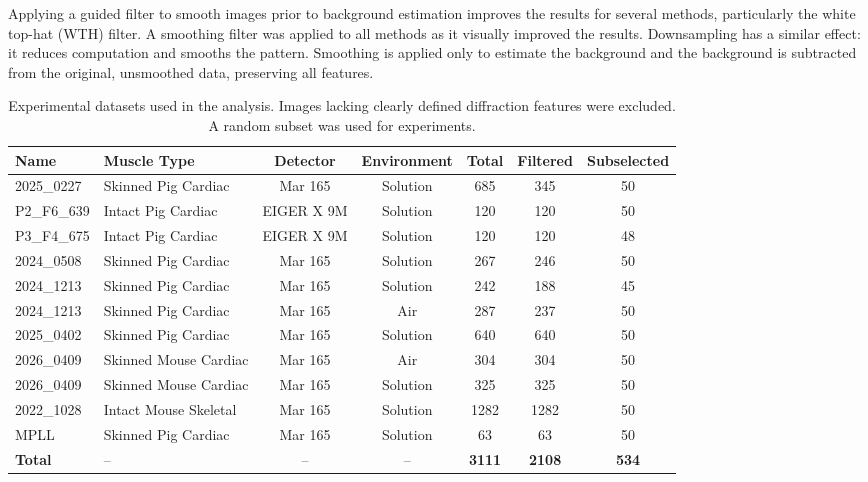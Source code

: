 \documentclass[journal,article,submit,moreauthors]{Definitions/mdpi}
\begin{document}
Applying a guided filter to smooth images prior to background estimation improves the results for several methods, particularly the white top-hat (WTH) filter. A smoothing filter was applied to all methods as it visually improved the results. Downsampling has a similar effect: it reduces computation and smooths the pattern. Smoothing is applied only to estimate the background and the background is subtracted from the original, unsmoothed data, preserving all features.

\begin{table}[h]
\caption{Experimental datasets used in the analysis. Images lacking clearly defined diffraction features were excluded. A random subset was used for experiments.}
\label{tab:datasets}
\centering
\footnotesize
\setlength{\tabcolsep}{4pt}
\renewcommand{\arraystretch}{1.0}
\begin{tabular}{@{}llccccc@{}}
\toprule
\textbf{Name} & \textbf{Muscle Type} & \textbf{Detector} & \textbf{Environment} & \textbf{Total} & \textbf{Filtered} & \textbf{Subselected} \\ \midrule
2025\_0227 & Skinned Pig Cardiac & Mar 165 & Solution & 685 & 345 & 50 \\
P2\_F6\_639 & Intact Pig Cardiac & EIGER X 9M & Solution & 120 & 120 & 50 \\
P3\_F4\_675 & Intact Pig Cardiac & EIGER X 9M & Solution & 120 & 120 & 48 \\
2024\_0508 & Skinned Pig Cardiac & Mar 165 & Solution & 267 & 246 & 50 \\
2024\_1213 & Skinned Pig Cardiac & Mar 165 & Solution & 242 & 188 & 45 \\
2024\_1213 & Skinned Pig Cardiac & Mar 165 & Air & 287 & 237 & 50 \\
2025\_0402 & Skinned Pig Cardiac & Mar 165 & Solution & 640 & 640 & 50 \\
2026\_0409 & Skinned Mouse Cardiac & Mar 165 & Air & 304 & 304 & 50 \\
2026\_0409 & Skinned Mouse Cardiac & Mar 165 & Solution & 325 & 325 & 50 \\
2022\_1028 & Intact Mouse Skeletal & Mar 165 & Solution & 1282 & 1282 & 50 \\
MPLL & Skinned Pig Cardiac & Mar 165 & Solution & 63 & 63 & 50 \\ \midrule
\textbf{Total} & -- & -- & -- & \textbf{3111} & \textbf{2108} & \textbf{534} \\
\bottomrule
\end{tabular}
\end{table}
\end{document}
